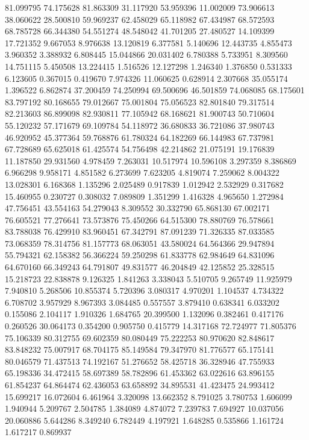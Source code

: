 81.099795
74.175628
81.863309
31.117920
53.959396
11.002009
73.906613
38.060622
28.500810
59.969237
62.458029
65.118982
67.434987
68.572593
68.785728
66.344380
54.551274
48.548042
41.701205
27.480527
14.109399
17.721352
9.667053
8.976638
13.120819
6.377581
5.140696
12.443735
4.855473
3.960352
3.388932
6.808445
15.044866
20.031402
6.780388
5.733951
8.309560
14.751115
5.450508
13.224415
1.516526
12.127298
1.246340
1.376850
0.531333
6.123605
0.367015
0.419670
7.974326
11.060625
0.628914
2.307668
35.055174
1.396522
6.862874
37.200459
74.250994
69.500696
46.501859
74.068085
68.175601
83.797192
80.168655
79.012667
75.001804
75.056523
82.801840
79.317514
82.213603
86.899098
82.930811
77.105942
68.168621
81.900743
50.710604
55.120232
57.171679
69.109784
54.118972
36.680833
36.721086
37.980743
46.920952
45.377364
59.768876
61.780324
64.182269
66.144983
67.737981
67.728689
65.625018
61.425574
54.756498
42.214862
21.075191
19.176839
11.187850
29.931560
4.978459
7.263031
10.517974
10.596108
3.297359
8.386869
6.966298
9.958171
4.851582
6.273699
7.623205
4.819074
7.259062
8.004322
13.028301
6.168368
1.135296
2.025489
0.917839
1.012942
2.532929
0.317682
15.460955
0.230727
0.308032
7.089809
1.351299
1.416328
4.965650
1.272984
47.756451
43.554163
54.279043
8.309552
30.332790
65.868130
67.002171
76.605521
77.276641
73.573876
75.450266
64.515300
78.880769
76.578661
83.788038
76.429910
83.960451
67.342791
87.091239
71.326335
87.033585
73.068359
78.314756
81.157773
68.063051
43.580024
64.564366
29.947894
55.794321
62.158382
56.366224
59.250298
61.833778
62.984649
64.831096
64.670160
66.349243
64.791807
49.831577
46.204849
42.125852
25.328515
15.218723
22.838878
9.126325
1.841263
3.338043
5.510705
9.265749
11.925979
7.940810
5.268506
10.855374
5.720396
3.080317
4.970201
1.104537
4.734322
6.708702
3.957929
8.967393
3.084485
0.557557
3.879410
0.638341
6.033202
0.155086
2.104117
1.910326
1.684765
20.399500
1.132096
0.382461
0.417176
0.260526
30.064173
0.354200
0.905750
0.415779
14.317168
72.724977
71.805376
75.106339
80.312755
69.602359
80.080449
75.222253
80.970620
82.848617
83.848232
75.007917
68.704175
85.149584
79.347970
81.776577
65.175141
80.046579
71.437513
74.192167
51.276652
58.425718
36.328946
47.755933
65.198336
34.472415
58.697389
58.782896
61.453362
63.022616
63.896155
61.854237
64.864474
62.436053
63.658892
34.895531
41.423475
24.993412
15.699217
16.072604
6.461964
3.320098
13.662352
8.791025
3.780753
1.606099
1.940944
5.209767
2.504785
1.384089
4.874072
7.239783
7.694927
10.037056
20.060886
5.644286
8.349240
6.782449
4.197921
1.648285
0.535866
1.161724
1.617217
0.869937
